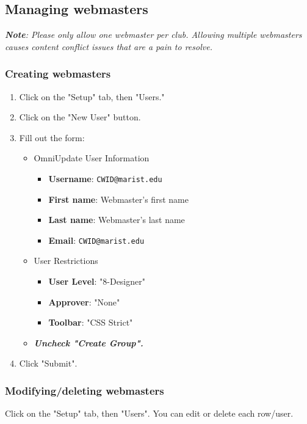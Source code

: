 \documentclass[11pt]{report}
\begin{document}
		\subsection{Managing webmasters}
			\textit{\textbf{Note}: Please only allow one webmaster per club. Allowing multiple webmasters causes content conflict issues that are a pain to resolve.}
		
			\subsubsection{Creating webmasters}
				\begin{enumerate}
					\item{Click on the "Setup" tab, then "Users."}
					\item{Click on the "New User" button.}
					\item{
						Fill out the form:
						\begin{itemize}
							\item{
								OmniUpdate User Information
								\begin{itemize}
									\item{\textbf{Username}: \texttt{CWID@marist.edu}}
									\item{\textbf{First name}: Webmaster's first name}
									\item{\textbf{Last name}: Webmaster's last name}
									\item{\textbf{Email}: \texttt{CWID@marist.edu}}
								\end{itemize}
							}
							\item{
								User Restrictions
								\begin{itemize}
									\item{\textbf{User Level}: "8-Designer"}
									\item{\textbf{Approver}: "None"}
									\item{\textbf{Toolbar}: "CSS Strict"}
								\end{itemize}
							}
							\item{\textbf{\textit{Uncheck "Create Group".}}}
						\end{itemize}
					}
					\item{Click "Submit".}
				\end{enumerate}

			\subsubsection{Modifying/deleting webmasters}
				Click on the "Setup" tab, then "Users". You can edit or delete each row/user.
		
\end{document}
